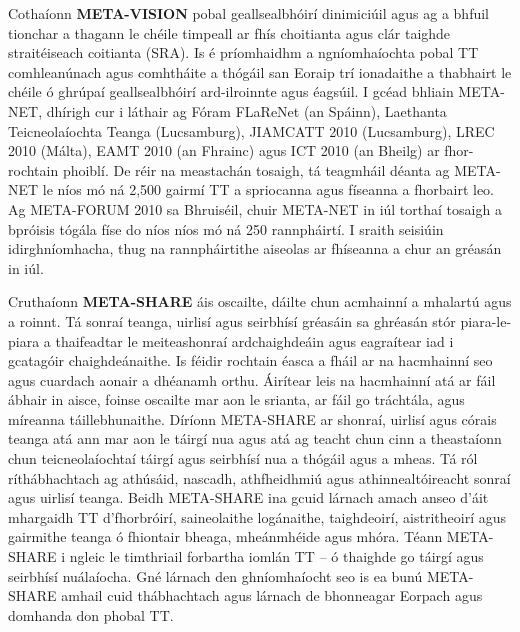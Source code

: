 \begin{multicols}{2}
Cothaíonn \textbf{META-VISION} pobal geallsealbhóirí dinimiciúil agus ag a bhfuil tionchar a thagann le chéile timpeall ar fhís choitianta agus clár taighde straitéiseach coitianta (SRA). Is é príomhaidhm a ngníomhaíochta pobal TT comhleanúnach agus comhtháite a thógáil san Eoraip trí ionadaithe a thabhairt le chéile ó ghrúpaí geallsealbhóirí ard-ilroinnte agus éagsúil. I gcéad bhliain META-NET, dhírigh cur i láthair ag Fóram FLaReNet (an Spáinn), Laethanta Teicneolaíochta Teanga (Lucsamburg), JIAMCATT 2010 (Lucsamburg), LREC 2010 (Málta), EAMT 2010 (an Fhrainc) agus ICT 2010 (an Bheilg) ar fhor-rochtain phoiblí. De réir na meastachán tosaigh, tá teagmháil déanta ag META-NET le níos mó ná 2,500 gairmí TT a spriocanna agus físeanna a fhorbairt leo. Ag META-FORUM 2010 sa Bhruiséil, chuir META-NET in iúl torthaí tosaigh a bpróisis tógála físe do níos níos mó ná 250 rannpháirtí. I sraith seisiúin idirghníomhacha, thug na rannpháirtithe aiseolas ar fhíseanna a chur an gréasán in iúl.

Cruthaíonn \textbf{META-SHARE} áis oscailte, dáilte chun acmhainní a mhalartú agus a roinnt. Tá sonraí teanga, uirlisí agus seirbhísí gréasáin sa ghréasán stór piara-le-piara a thaifeadtar le meiteashonraí ardchaighdeáin agus eagraítear iad i gcatagóir chaighdeánaithe. Is féidir rochtain éasca a fháil ar na hacmhainní seo agus cuardach aonair a dhéanamh orthu. Áirítear leis na hacmhainní atá ar fáil ábhair in aisce, foinse oscailte mar aon le srianta, ar fáil go tráchtála, agus míreanna táillebhunaithe. Díríonn META-SHARE ar shonraí, uirlisí agus córais teanga atá ann mar aon le táirgí nua agus atá ag teacht chun cinn a theastaíonn chun teicneolaíochtaí táirgí agus seirbhísí nua a thógáil agus a mheas. Tá ról ríthábhachtach ag athúsáid, nascadh, athfheidhmiú agus athinnealtóireacht sonraí agus uirlisí teanga. Beidh META-SHARE ina gcuid lárnach amach anseo d’áit mhargaidh TT d’fhorbróirí, saineolaithe logánaithe, taighdeoirí, aistritheoirí agus gairmithe teanga ó fhiontair bheaga, mheánmhéide agus mhóra. Téann META-SHARE i ngleic le timthriail forbartha iomlán TT – ó thaighde go táirgí agus seirbhísí nuálaíocha. Gné lárnach den ghníomhaíocht seo is ea bunú META-SHARE amhail cuid thábhachtach agus lárnach de bhonneagar Eorpach agus domhanda don phobal TT.


\end{multicols}

